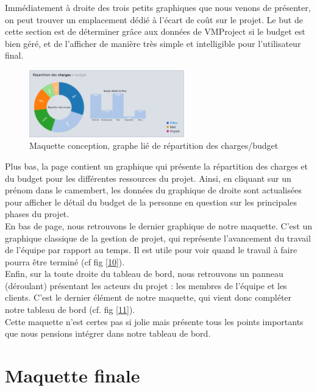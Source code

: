 \documentclass[12pt]{report}
\begin{document}
Immédiatement à droite des trois petits graphiques que nous venons de présenter, on peut trouver un emplacement dédié à l'écart de coût sur le projet. Le but de cette section est de déterminer grâce aux données de VMProject si le budget est bien géré, et de l'afficher de manière très simple et intelligible pour l'utilisateur final.\\

\begin{figure}[H]
	\centering
	\includegraphics[width=0.6\textwidth]{pictures/notreMaquette/repartition.jpg}
	\caption{Maquette conception, graphe lié de répartition des charges/budget}
	\label{9}
\end{figure}

Plus bas, la page contient un graphique qui présente la répartition des charges et du budget pour les différentes ressources du projet. Ainsi, en cliquant sur un prénom dans le camembert, les données du graphique de droite sont actualisées pour afficher le détail du budget de la personne en question sur les principales phases du projet.\\

En bas de page, nous retrouvons le dernier graphique de notre maquette. C'est un graphique classique de la gestion de projet, qui représente l'avancement du travail de l'équipe par rapport au temps. Il est utile pour voir quand le travail à faire pourra être terminé (cf fig \ref{10}).\\

Enfin, sur la toute droite du tableau de bord, nous retrouvons un panneau (déroulant) présentant les acteurs du projet : les membres de l'équipe et les clients. C'est le dernier élément de notre maquette, qui vient donc compléter notre tableau de bord (cf. fig \ref{11}).\\


Cette maquette n'est certes pas si jolie mais présente tous les points importants que nous pensions intégrer dans notre tableau de bord.

	\section{Maquette finale}
\end{document}
